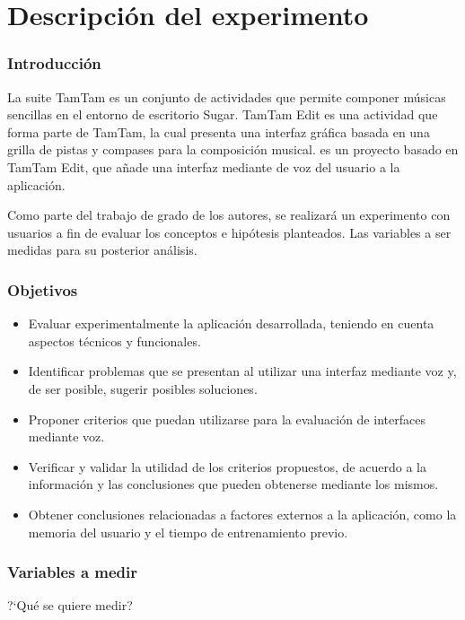 \section{Descripci\'on del experimento}

\subsubsection{Introducci\'on}

La suite TamTam es un conjunto de actividades que permite componer m\'usicas sencillas en el entorno de 
escritorio Sugar. TamTam Edit es una actividad que forma parte de TamTam, la cual presenta una interfaz 
gr\'afica basada en una grilla de pistas y compases para la composici\'on musical. 
 es un proyecto basado en TamTam Edit, que a\~nade una interfaz mediante de 
voz del usuario a la aplicaci\'on.

Como parte del trabajo de grado de los autores, se realizar\'a un experimento con usuarios a fin de evaluar los conceptos e hip\'otesis planteados. Las variables a ser medidas para su posterior an\'alisis.

\subsubsection{Objetivos}

\begin{itemize}
\item Evaluar experimentalmente la aplicaci\'on desarrollada, teniendo en cuenta aspectos t\'ecnicos y funcionales.
\item Identificar problemas que se presentan al utilizar una interfaz mediante voz y, de ser posible, sugerir posibles soluciones.
\item Proponer criterios que puedan utilizarse para la evaluaci\'on de interfaces mediante voz.
\item Verificar y validar la utilidad de los criterios propuestos, de acuerdo a la informaci\'on y las conclusiones que pueden obtenerse mediante los mismos.
\item Obtener conclusiones relacionadas a factores externos a la aplicaci\'on, como la memoria del usuario y el tiempo de entrenamiento previo.
\end{itemize}

\subsubsection{Variables a medir}
{?`}Qu\'e se quiere medir?

